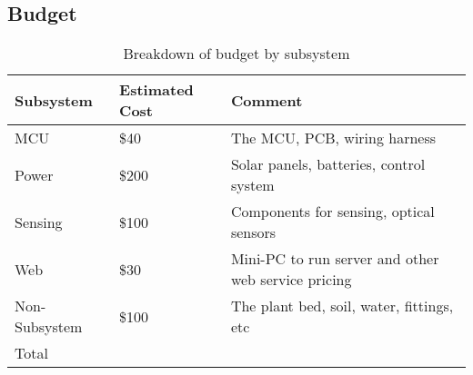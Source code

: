 \subsection{Budget}
\begin{table}[H]
    \centering
    \begin{tabularx}{.8\textwidth}
        {
            | >{\raggedright\arraybackslash}X
            | >{\raggedright\arraybackslash}X
            | >{\raggedleft\arraybackslash}X
            |
        }
        \hline
        Subsystem & Estimated Cost & Comment \\
        \hline
        MCU & \$40 & The MCU, PCB, wiring harness \\
        \hline
        Power & \$200 & Solar panels, batteries, control system \\
        \hline
        Sensing & \$100 & Components for sensing, optical sensors \\
        \hline
        Web & \$30 & Mini-PC to run server and other web service pricing \\
        \hline
        Non-Subsystem & \$100 & The plant bed, soil, water, fittings, etc \\
        \hline
        Total & \multicolumn{2}{|c|}{\$470}\\
        \hline
    \end{tabularx}
    \caption{Breakdown of budget by subsystem}
\end{table}